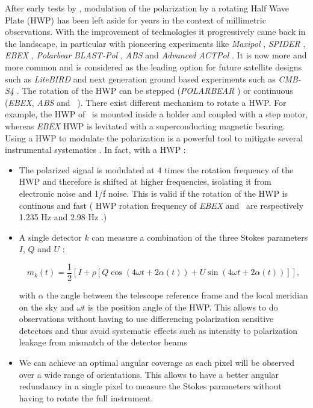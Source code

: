 After early tests by \citep{1984ApJ...284L..51H}, modulation of the polarization by a rotating Half Wave Plate (HWP) has been left aside for  years in the context of millimetric observations. With the improvement of technologies it progressively came back in the landscape, in particular with pioneering experiments like \emph{Maxipol} \citep{2007ApJ...665...42J}, \emph{SPIDER} \citep{2008SPIE.7010E..2PC}, \emph{EBEX} \citep{2010SPIE.7741E..1CR}, \emph{Polarbear} \citep{2012SPIE.8452E..1CK} \emph{BLAST-Pol} \citep{2014MNRAS.437.2772M}, \emph{ABS} \citep{2014RScI...85c9901K} and \emph{Advanced ACTPol} \citep{2016JLTP..184..772H}. It is now more and more common and is considered as the leading option for future satellite designs such as \emph{LiteBIRD} \citep{2014JLTP..176..733M} and next generation ground based experiments such as \emph{CMB-S4} \citep{2016arXiv161002743A}. The rotation of the HWP can be stepped (\emph{POLARBEAR} \citep{2014ApJ...794..171P}) or continuous  (\emph{EBEX}, \emph{ABS} and \nikad\  \citep{2015fers.confE..16R}). There exist different mechanism to rotate a HWP. For example, the HWP of \nikad\ is mounted inside a holder and coupled with a step motor, whereas \emph{EBEX} HWP is levitated with a superconducting magnetic bearing.
Using a HWP to modulate the polarization is a powerful tool to mitigate several instrumental systematics \citep{2009MNRAS.397..634B}. In fact, with a HWP :

\begin{itemize}
\item The polarized signal is modulated at 4 times the rotation frequency of the HWP and therefore is shifted at higher frequencies, isolating it from electronic noise and 1/f noise. This is valid if the rotation of the HWP is continous and fast ( HWP rotation frequency of \emph{EBEX} and \nika\ are respectively 1.235 Hz \citep{2018ApJS..239....7T} and 2.98 Hz \citep{2017A&A...599A..34R}.)

\item A single detector $k$ can measure a combination of the three Stokes parameters $I$, $Q$ and $U$ :

\begin{equation}
\label{eq:polar_measure}
m_{k}(t) = \frac{1}{2} [I + \rho [Q \cos (4 \omega t + 2 \alpha(t)) + U \sin (4 \omega t + 2 \alpha(t))]],
\end{equation}

with $\alpha$ the angle between the telescope reference frame and the local meridian on the sky and $\omega t$ is the position angle of the HWP.
This allows to do observations without having to use differencing polarization sensitive detectors and thus avoid systematic effects such as intensity to polarization leakage from mismatch of the detector beams \citep{2008PhRvD..77h3003S, 2015ApJ...814..110B}

\item We can achieve an optimal angular coverage as each pixel will be observed over a wide range of orientations. This allows to have a better angular redundancy in a single pixel to measure the Stokes parameters without having to rotate the full instrument.
\end{itemize}

